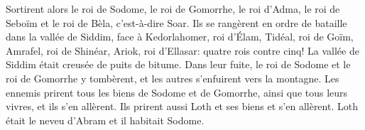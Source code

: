 Sortirent alors le roi de Sodome, le roi de Gomorrhe, le roi d’Adma,
	le roi de Seboïm et le roi de Bèla, c’est-à-dire Soar.
Ils se rangèrent en ordre de bataille dans la vallée de Siddim,
	face à Kedorlahomer, roi d’Élam, Tidéal, roi de Goïm,
	Amrafel, roi de Shinéar, Ariok, roi d’Ellasar:
	quatre rois contre cinq!
La vallée de Siddim était creusée de puits de bitume.
	Dans leur fuite, le roi de Sodome et le roi de Gomorrhe y tombèrent,
	et les autres s’enfuirent vers la montagne.
Les ennemis prirent tous les biens de Sodome et de Gomorrhe,
	ainsi que tous leurs vivres, et ils s’en allèrent.
Ils prirent aussi Loth et ses biens et s’en allèrent.
	Loth était le neveu d’Abram et il habitait Sodome.
